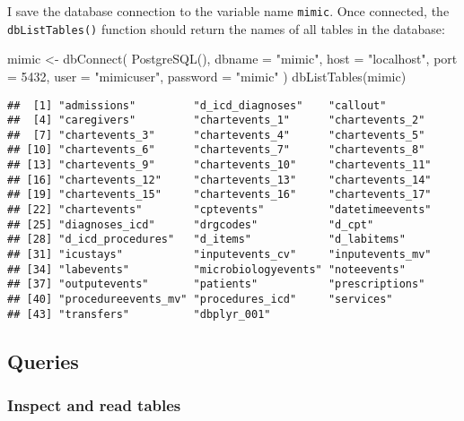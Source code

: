 \documentclass[
]{article}
\newenvironment{Shaded}{\begin{snugshade}}{\end{snugshade}}
\newcommand{\AttributeTok}[1]{\textcolor[rgb]{0.77,0.63,0.00}{#1}}
\newcommand{\DecValTok}[1]{\textcolor[rgb]{0.00,0.00,0.81}{#1}}
\newcommand{\FunctionTok}[1]{\textcolor[rgb]{0.00,0.00,0.00}{#1}}
\newcommand{\NormalTok}[1]{#1}
\newcommand{\OtherTok}[1]{\textcolor[rgb]{0.56,0.35,0.01}{#1}}
\newcommand{\StringTok}[1]{\textcolor[rgb]{0.31,0.60,0.02}{#1}}
\begin{document}
I save the database connection to the variable name \texttt{mimic}. Once
connected, the \texttt{dbListTables()} function should return the names
of all tables in the database:

\begin{Shaded}
\begin{Highlighting}[]
\NormalTok{mimic }\OtherTok{\textless{}{-}} \FunctionTok{dbConnect}\NormalTok{(}
  \FunctionTok{PostgreSQL}\NormalTok{(),}
  \AttributeTok{dbname =} \StringTok{"mimic"}\NormalTok{,}
  \AttributeTok{host =} \StringTok{"localhost"}\NormalTok{,}
  \AttributeTok{port =} \DecValTok{5432}\NormalTok{,}
  \AttributeTok{user =} \StringTok{"mimicuser"}\NormalTok{,}
  \AttributeTok{password =} \StringTok{"mimic"}
\NormalTok{)}
\FunctionTok{dbListTables}\NormalTok{(mimic)}
\end{Highlighting}
\end{Shaded}

\begin{verbatim}
##  [1] "admissions"         "d_icd_diagnoses"    "callout"           
##  [4] "caregivers"         "chartevents_1"      "chartevents_2"     
##  [7] "chartevents_3"      "chartevents_4"      "chartevents_5"     
## [10] "chartevents_6"      "chartevents_7"      "chartevents_8"     
## [13] "chartevents_9"      "chartevents_10"     "chartevents_11"    
## [16] "chartevents_12"     "chartevents_13"     "chartevents_14"    
## [19] "chartevents_15"     "chartevents_16"     "chartevents_17"    
## [22] "chartevents"        "cptevents"          "datetimeevents"    
## [25] "diagnoses_icd"      "drgcodes"           "d_cpt"             
## [28] "d_icd_procedures"   "d_items"            "d_labitems"        
## [31] "icustays"           "inputevents_cv"     "inputevents_mv"    
## [34] "labevents"          "microbiologyevents" "noteevents"        
## [37] "outputevents"       "patients"           "prescriptions"     
## [40] "procedureevents_mv" "procedures_icd"     "services"          
## [43] "transfers"          "dbplyr_001"
\end{verbatim}

\hypertarget{queries}{%
\subsection{Queries}\label{queries}}

\hypertarget{inspect-and-read-tables}{%
\subsubsection{Inspect and read tables}\label{inspect-and-read-tables}}
\end{document}
